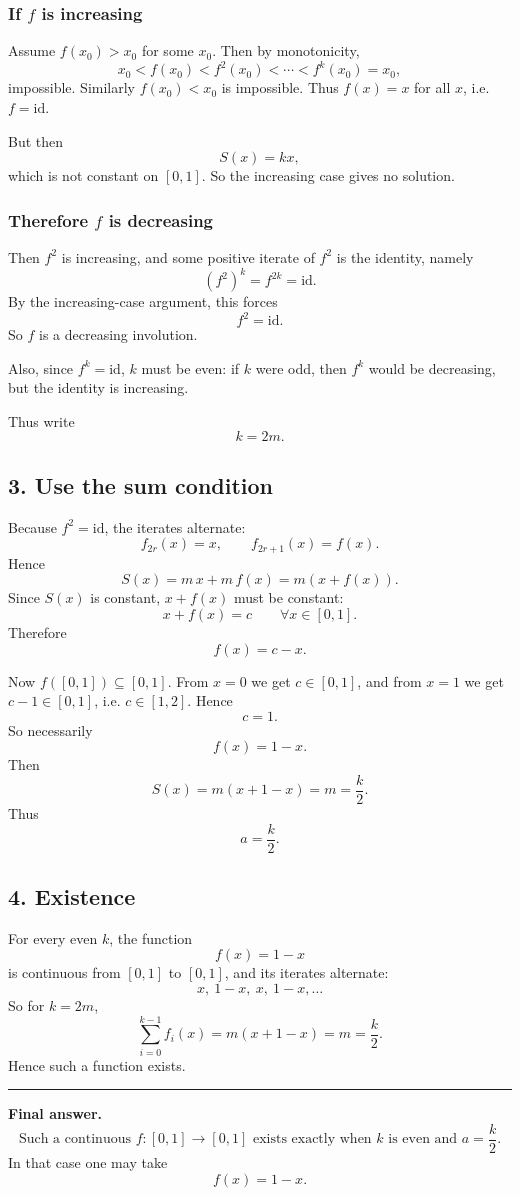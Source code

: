 \documentclass[12pt,a4paper]{article}
\begin{document}
\subsubsection*{If \(f\) is increasing}
Assume \(f(x_0)>x_0\) for some \(x_0\). Then by monotonicity,
\[
x_0<f(x_0)<f^2(x_0)<\cdots<f^k(x_0)=x_0,
\]
impossible. Similarly \(f(x_0)<x_0\) is impossible. Thus \(f(x)=x\) for all \(x\), i.e. \(f=\mathrm{id}\).

But then
\[
S(x)=kx,
\]
which is not constant on \([0,1]\). So the increasing case gives no solution.

\subsubsection*{Therefore \(f\) is decreasing}
Then \(f^2\) is increasing, and some positive iterate of \(f^2\) is the identity, namely
\[
(f^2)^k=f^{2k}=\mathrm{id}.
\]
By the increasing-case argument, this forces
\[
f^2=\mathrm{id}.
\]
So \(f\) is a decreasing involution.

Also, since \(f^k=\mathrm{id}\), \(k\) must be even: if \(k\) were odd, then \(f^k\) would be decreasing, but the identity is increasing.

Thus write
\[
k=2m.
\]

\subsection*{3. Use the sum condition}

Because \(f^2=\mathrm{id}\), the iterates alternate:
\[
f_{2r}(x)=x,\qquad f_{2r+1}(x)=f(x).
\]
Hence
\[
S(x)=m\,x+m\,f(x)=m(x+f(x)).
\]
Since \(S(x)\) is constant, \(x+f(x)\) must be constant:
\[
x+f(x)=c \qquad \forall x\in[0,1].
\]
Therefore
\[
f(x)=c-x.
\]

Now \(f([0,1])\subseteq [0,1]\). From \(x=0\) we get \(c\in[0,1]\), and from \(x=1\) we get \(c-1\in[0,1]\), i.e. \(c\in[1,2]\). Hence
\[
c=1.
\]
So necessarily
\[
f(x)=1-x.
\]
Then
\[
S(x)=m(x+1-x)=m=\frac{k}{2}.
\]
Thus
\[
a=\frac{k}{2}.
\]

\subsection*{4. Existence}

For every even \(k\), the function
\[
f(x)=1-x
\]
is continuous from \([0,1]\) to \([0,1]\), and its iterates alternate:
\[
x,\ 1-x,\ x,\ 1-x,\dots
\]
So for \(k=2m\),
\[
\sum_{i=0}^{k-1} f_i(x)=m(x+1-x)=m=\frac{k}{2}.
\]
Hence such a function exists.


\medskip\hrule\medskip


\textbf{Final answer.}
\[
\boxed{\text{Such a continuous }f:[0,1]\to[0,1]\text{ exists exactly when }k\text{ is even and }a=\frac{k}{2}.}
\]
In that case one may take
\[
\boxed{f(x)=1-x.}
\]
\newpage
\end{document}
